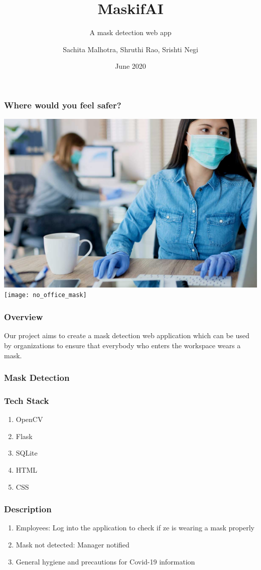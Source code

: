 \documentclass[14pt]{beamer}
\title{MaskifAI}
\subtitle{A mask detection web app}
\author[TEAM 6]{Sachita Malhotra, Shruthi Rao, Srishti Negi}
\date{June 2020}
\begin{document}
\begin{frame}
    \titlepage
\end{frame}

\begin{frame}
    \frametitle{Where would you feel safer?}
    \includegraphics[width=4.5 cm,height=3.5 cm]{office_mask}
    \texttt{[image: no\_office\_mask]}
\end{frame}

\begin{frame}
    \frametitle{Overview}
    Our project aims to create a mask detection web application which can be used by organizations to ensure that everybody who enters the workspace wears a mask.
\end{frame}

\begin{frame}
    \frametitle{Mask Detection}
    
\end{frame}

\begin{frame}
    \frametitle{Tech Stack}
    \begin{enumerate}
        \item OpenCV
        \item Flask
        \item SQLite
        \item HTML
        \item CSS
    \end{enumerate}
\end{frame} 

\begin{frame}
    \frametitle{Description}
    \begin{enumerate}

        \item Employees: Log into the application to check if ze is wearing a mask properly

        \item Mask not detected: Manager notified

        \item General hygiene and precautions for Covid-19 information
    \end{enumerate}
\end{frame}
\end{document}

